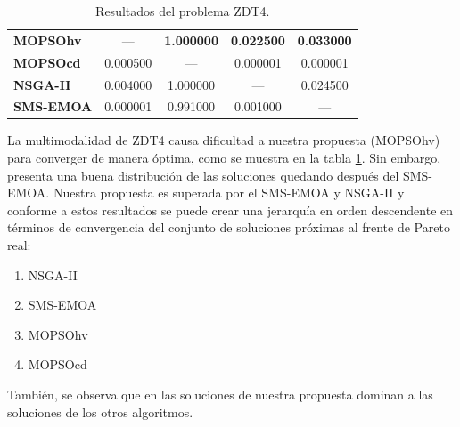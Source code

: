 \begin{table}
\begin{center}
\begin{tabular}{|l|cc|cc|}
	\textbf{MOPSOhv} & ---      & \textbf{1.000000} & \textbf{0.022500} & \textbf{0.033000} \\ 
	\textbf{MOPSOcd} & 0.000500 & ---      & 0.000001 & 0.000001   \\ 
	\textbf{NSGA-II} & 0.004000 & 1.000000 & ---      & 0.024500 \\  
	\textbf{SMS-EMOA}& 0.000001 & 0.991000 & 0.001000 & --- \\  
	\hline\hline
	\end{tabular}
\caption{Resultados del problema ZDT4.}
  \label{tab:zdt4}
\end{center}
\end{table}

La multimodalidad de ZDT4 causa dificultad a nuestra propuesta (MOPSOhv) para converger de manera \'optima, como se muestra en la 
tabla \ref{tab:zdt4}. Sin embargo, presenta una buena distribuci\'on de las soluciones quedando despu\'es del SMS-EMOA. Nuestra propuesta 
es superada por el SMS-EMOA y NSGA-II y conforme a estos resultados se puede crear una
jerarqu\'ia en orden descendente en t\'erminos de convergencia del conjunto de soluciones pr\'oximas al frente de Pareto real:

\begin{enumerate}
  \item NSGA-II
  \item SMS-EMOA
  \item MOPSOhv
  \item MOPSOcd
\end{enumerate}

Tambi\'en, se observa que en las soluciones de nuestra propuesta dominan a las soluciones de los otros algoritmos.

